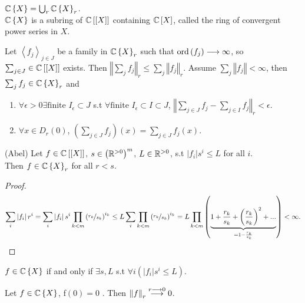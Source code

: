 \begin{defn*}
\label{10.4} $\mathbb{C}\left\{ X\right\} =\bigcup_{r}\mathbb{C}\left\{ X\right\} _{r}$.\\
$\mathbb{C}\left\{ X\right\} $ is a subring of $\mathbb{C}\left[\left[X\right]\right]$
containing $\mathbb{C}\left[X\right]$, called the ring of convergent power
series in $X$.\end{defn*}
\begin{xca*}
\label{10.5} Let $\left\langle f_{j}\right\rangle _{j\in J}$ be a family
in $\mathbb{C}\left\{ X\right\} _{r}$ such that $\mathrm{ord}\left(f_{j}\right)\longrightarrow\infty$,
so $\sum_{j\in J}\in\mathbb{C}\left[\left[X\right]\right]$ exists. Then $\left\Vert \sum_{j}f_{j}\right\Vert _{r}\leq\sum_{j}\left\Vert f_{j}\right\Vert _{r}$.
Assume $\sum_{j}\left\Vert f_{j}\right\Vert <\infty$, then $\sum_{j}f_{j}\in\mathbb{C}\left\{ X\right\} _{r}$
and\end{xca*}
\begin{enumerate}
\item $\forall\epsilon>0\exists\textrm{finite }I_{\epsilon}\subset J$ s.t
$\forall\textrm{finite }I_{\epsilon}\subset I\subset J$, $\left\Vert \sum_{j\in J}f_{j}-\sum_{j\in I}f_{j}\right\Vert _{r}<\epsilon$.
\item $\forall x\in D_{r}\left(0\right)$, $\left(\sum_{j\in J}f_{j}\right)\left(x\right)=\sum_{j\in J}f_{j}\left(x\right)$.\end{enumerate}
\begin{lem*}
\label{10.6} (Abel) Let $f\in\mathbb{C}\left[\left[X\right]\right]$, $s\in\left(\mathbb{R}^{>0}\right)^{m}$,
$L\in\mathbb{R}^{>0}$, s.t $\left|f_{i}\right|s^{i}\leq L$ for all $i$.\\
Then $f\in\mathbb{C}\left\{ X\right\} _{r}$ for all $r<s$.\end{lem*}
\begin{proof}
\[
\sum_{i}\left|f_{i}\right|r^{i}=\sum_{i}\left|f_{i}\right|s^{i}\prod_{k<m}\left(\nicefrac{r_{k}}{s_{k}}\right)^{i_{k}}\leq L\sum_{i}\prod_{k<m}\left(\nicefrac{r_{k}}{s_{k}}\right)^{i_{k}}=L\prod_{k<m}\left(\underbrace{1+\frac{r_{k}}{s_{k}}+\left(\frac{r_{k}}{s_{k}}\right)^{2}+...}_{=1-\frac{r_{k}}{s_{k}}}\right)<\infty.
\]
 \end{proof}
\begin{cor*}
\label{10.7} $f\in\mathbb{C}\left\{ X\right\} $ if and only if $\exists s,L$ s.t
$\forall i\left(\left|f_{i}\right|s^{i}\leq L\right)$.\end{cor*}
\begin{lem*}
\label{10.8} Let $f\in\mathbb{C}\left\{ X\right\} $, f$\left(0\right)=0$ . Then
$\left\Vert f\right\Vert _{r}\overset{r\longrightarrow0}{\longrightarrow}0$.\end{lem*}

